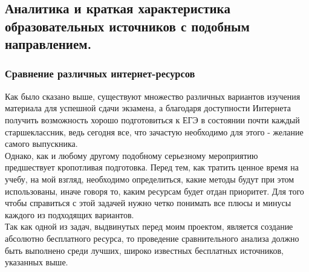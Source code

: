 \documentclass[a4paper, 12pt]{extarticle}
\begin{document}
\subsection{Аналитика и краткая характеристика образовательных источников с
подобным направлением.}
\subsubsection{Сравнение различных интернет-ресурсов}
Как было сказано выше, существуют множество различных вариантов изучения
материала для успешной сдачи экзамена, а благодаря доступности Интернета
получить возможность хорошо подготовиться к ЕГЭ в состоянии почти каждый
старшеклассник, ведь сегодня все, что зачастую необходимо для этого - желание
самого выпускника.
\\

Однако, как и любому другому подобному серьезному мероприятию предшествует
кропотливая подготовка. Перед тем, как тратить ценное время на учебу, на мой
взгляд, необходимо определиться, какие методы будут при этом использованы,
иначе говоря то, каким ресурсам будет отдан приоритет. Для того чтобы
справиться с этой задачей нужно четко понимать все плюсы и минусы каждого из
подходящих вариантов.
\\

Так как одной из задач, выдвинутых перед моим проектом, является создание
абсолютно бесплатного ресурса, то проведение сравнительного анализа должно быть
выполнено среди лучших, широко известных бесплатных источников, указанных выше.
\\
\end{document}
